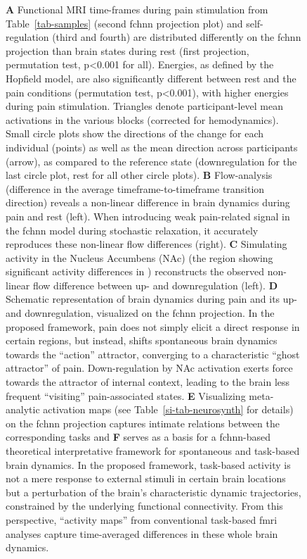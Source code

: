 \documentclass{article}
\begin{document}
\begin{figure}[!htbp]
{\textbf{A} Functional MRI time-frames during pain stimulation from Table~\ref{tab-samples} (second \acrshort{fchnn} projection plot)
and self-regulation (third and fourth) are distributed differently on the \acrshort{fchnn} projection than brain states
during rest (first projection, permutation test, p\textless 0.001 for all). Energies, as defined by the Hopfield model, are also
significantly different between rest and the pain conditions (permutation test, p\textless 0.001), with higher energies during
pain stimulation. Triangles denote participant-level mean activations in the various blocks (corrected for
hemodynamics). Small circle plots show the directions of the change for each individual (points) as well as the mean direction
across participants (arrow), as compared to the reference state (downregulation for the last circle plot, rest for all
other circle plots).
\textbf{B} Flow-analysis (difference in the average timeframe-to-timeframe transition direction) reveals a non-linear difference in brain dynamics during pain and rest (left). When introducing weak pain-related signal in the \acrshort{fchnn} model during stochastic relaxation, it accurately reproduces these non-linear flow differences (right).
\textbf{C} Simulating activity in the Nucleus Accumbens (NAc) (the region showing significant activity differences in \cite{woo2015distinct}) reconstructs the observed non-linear flow difference between up- and downregulation (left).
\textbf{D} Schematic representation of brain dynamics during pain and its up- and downregulation, visualized on the \acrshort{fchnn}  projection. In the proposed framework, pain does not simply elicit a direct response in certain regions, but instead, shifts spontaneous brain dynamics towards the ``action'' attractor, converging to a characteristic ``ghost attractor'' of pain. Down-regulation by NAc activation exerts force towards the attractor of internal context, leading to the brain less frequent ``visiting'' pain-associated states.
\textbf{E} Visualizing meta-analytic activation maps (see Table~\ref{si-tab-neurosynth} for details) on the \acrshort{fchnn} projection captures intimate relations between the corresponding tasks and \textbf{F} serves as a basis for a \acrshort{fchnn}-based theoretical interpretative framework for spontaneous and task-based brain dynamics. In the proposed framework, task-based activity is not a mere response to external stimuli in certain brain locations but a perturbation of the brain's characteristic dynamic trajectories, constrained by the underlying functional connectivity. From this perspective, ``activity maps'' from conventional task-based \acrshort{fmri} analyses capture time-averaged differences in these whole brain dynamics.}
\label{task-validity}
\end{figure}
\end{document}
